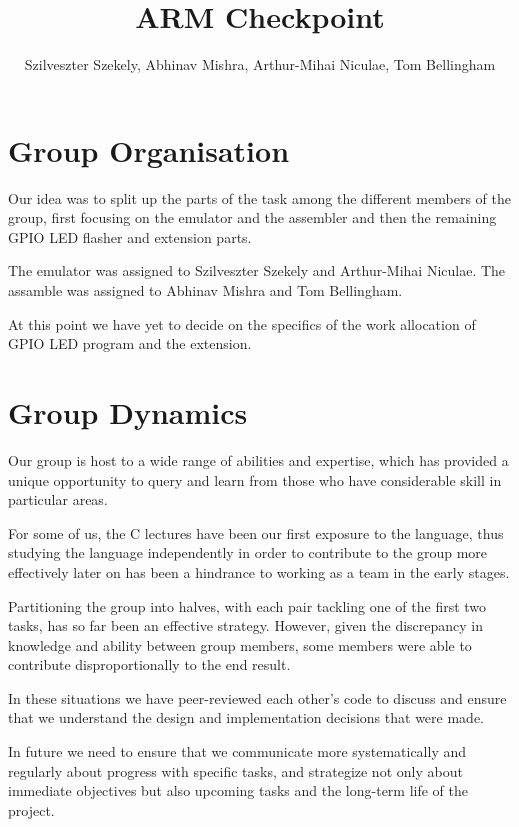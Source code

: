 \documentclass[11pt]{article}
\begin{document}
\title{ARM Checkpoint}
\author{
  Szilveszter Szekely,
  Abhinav Mishra,
  Arthur-Mihai Niculae,
  Tom Bellingham
}

\maketitle

\section{Group Organisation}

Our idea was to split up the parts of the task among the different members of
the group, first focusing on the emulator and the assembler and then the
remaining GPIO LED flasher and extension parts.

The emulator was assigned to Szilveszter Szekely and Arthur-Mihai Niculae.
The assamble was assigned to Abhinav Mishra and Tom Bellingham.

At this point we have yet to decide on the specifics of the work allocation of
GPIO LED program and the extension.

\section{Group Dynamics}

Our group is host to a wide range of abilities and expertise, which has provided
a unique opportunity to query and learn from those who have considerable skill
in particular areas.

For some of us, the C lectures have been our first exposure to the language,
thus studying the language independently in order to contribute to the group
more effectively later on has been a hindrance to working as a team in the early
stages.

Partitioning the group into halves, with each pair tackling one of the first two
tasks, has so far been an effective strategy. However, given the discrepancy in
knowledge and ability between group members, some members were able to
contribute disproportionally to the end result.

In these situations we have peer-reviewed each other's code to discuss and
ensure that we understand the design and implementation decisions that were
made.

In future we need to ensure that we communicate more systematically and
regularly about progress with specific tasks, and strategize not only about
immediate objectives but also upcoming tasks and the long-term life of the
project.
\end{document}
